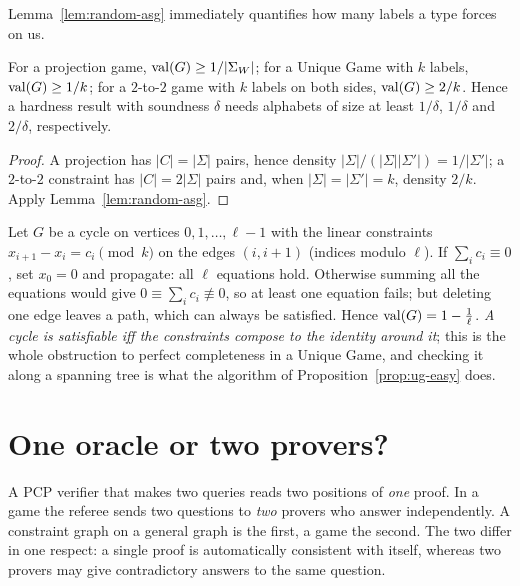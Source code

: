 Lemma~\ref{lem:random-asg} immediately quantifies how many labels a type forces on us.

\begin{corollary}\label{cor:alph}
For a projection game, $\operatorname{val}(G)\ge1/|\Sigma_W|$; for a Unique Game with $k$ labels, $\operatorname{val}(G)\ge1/k$;
for a $2$-to-$2$ game with $k$ labels on both sides, $\operatorname{val}(G)\ge 2/k$.  Hence a hardness result with soundness $\delta$ needs
alphabets of size at least $1/\delta$, $1/\delta$ and $2/\delta$, respectively.
\end{corollary}
\begin{proof}
A projection has $|C|=|\Sigma|$ pairs, hence density $|\Sigma|/(|\Sigma||\Sigma'|)=1/|\Sigma'|$; a $2$-to-$2$ constraint has
$|C|=2|\Sigma|$ pairs and, when $|\Sigma|=|\Sigma'|=k$, density $2/k$.  Apply Lemma~\ref{lem:random-asg}.
\end{proof}

\begin{example}\label{ex:cycle}
Let $G$ be a cycle on vertices $0,1,\dots,\ell-1$ with the linear constraints $x_{i+1}-x_i=c_i\pmod k$ on the edges
$(i,i+1)$ (indices modulo $\ell$).  If $\sum_ic_i\equiv0$, set $x_0=0$ and propagate: all $\ell$ equations hold.
Otherwise summing all the equations would give $0\equiv\sum_ic_i\not\equiv0$, so at least one equation fails; but
deleting one edge leaves a path, which can always be satisfied.  Hence $\operatorname{val}(G)=1-\tfrac1\ell$.
\emph{A cycle is satisfiable iff the constraints compose to the identity around it}; this is the whole
obstruction to perfect completeness in a Unique Game, and checking it along a spanning tree is what the algorithm
of Proposition~\ref{prop:ug-easy} does.
\end{example}


\section{One oracle or two provers?}
\label{sec:oracle}

A PCP verifier that makes two queries reads two positions of \emph{one} proof.  In a game the referee sends two
questions to \emph{two} provers who answer independently.  A constraint graph on a general graph is the first,
a game the second.  The two differ in one respect: a single proof is automatically consistent with itself, whereas
two provers may give contradictory answers to the same question.

